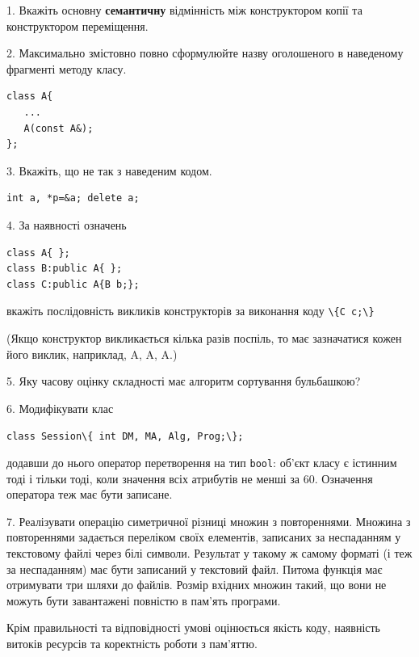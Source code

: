 \documentclass[12pt, ukrainian]{article}
\def\code#1{\Verb!#1!}
\begin{document}
{%
1. Вкажіть основну \textbf{семантичну} відмінність між конструктором копії та конструктором переміщення.%
\par
\vspace{2mm}
2. Максимально змістовно повно сформулюйте назву оголошеного в наведеному фрагменті методу класу.
\vspace{-3mm}
\begin{verbatim}class A{
   ...
   A(const A&);
};\end{verbatim}
\vspace{-3mm}
\par
\vspace{2mm}
3. Вкажіть, що не так з наведеним кодом.
\vspace{-3mm}
\begin{verbatim}int a, *p=&a; delete a;\end{verbatim}
\vspace{-3mm}
\par
\vspace{2mm}
4. За наявності означень
\vspace{-3mm}
\begin{verbatim}
class A{ };
class B:public A{ };
class C:public A{B b;};\end{verbatim}
\vspace{-3mm}
вкажіть послідовність викликів конструкторів за виконання коду \code{\{C c;\}} 

(Якщо конструктор викликається кілька разів поспіль, то має зазначатися кожен його виклик, наприклад, A, A, A.)

\vspace{2mm}
5. Яку часову оцінку складності має алгоритм сортування бульбашкою?
\par
\vspace{2mm}
6. Модифікувати клас 

\qquad\code{class Session\{ int DM, MA, Alg, Prog;\};} 


додавши до нього оператор перетворення на тип \code{bool}: об'єкт класу є істинним тоді і тільки тоді, коли значення всіх атрибутів не менші за 60. Означення оператора теж має бути записане.%
\par
\vspace{2mm}
7. 
Реалізувати операцію симетричної різниці множин з повтореннями. Множина з повтореннями задається переліком своїх елементів, записаних за неспаданням у текстовому файлі через білі символи. Результат у такому ж самому форматі (і теж за неспаданням) має бути записаний у текстовий файл. Питома функція має отримувати три шляхи до файлів. Розмір вхідних множин такий, що вони не можуть бути завантажені повністю в пам’ять програми.

Крім правильності та відповідності умові оцінюється якість коду, наявність витоків ресурсів та коректність роботи з пам'яттю. 

}
\end{document}
